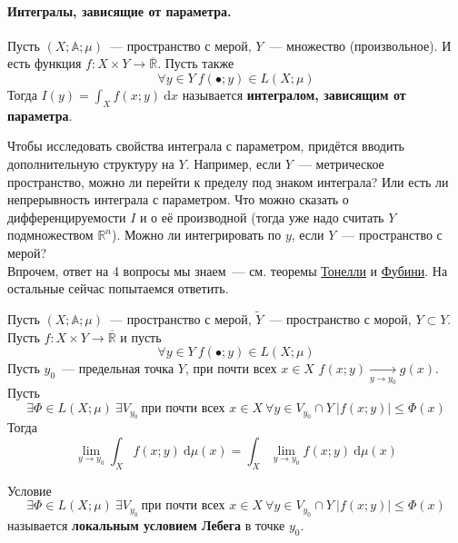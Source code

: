 \documentclass{article}
\begin{document}
    \paragraph{Интегралы, зависящие от параметра.}
    \begin{definition}
        Пусть $(X;\mathbb A;\mu)$~--- пространство с мерой, $Y$~--- множество (произвольное). И есть функция $f\colon X\times Y\to\overline{\mathbb R}$. Пусть также
        $$\forall y\in Y~f(\bullet;y)\in L(X;\mu)$$
        Тогда $I(y)=\int_Xf(x;y)~\mathrm dx$ называется \textbf{интегралом, зависящим от параметра}.
    \end{definition}
    \begin{remark}
        Чтобы исследовать свойства интеграла с параметром, придётся вводить дополнительную структуру на $Y$. Например, если $Y$~--- метрическое пространство, можно ли перейти к пределу под знаком интеграла? Или есть ли непрерывность интеграла с параметром. Что можно сказать о дифференцируемости $I$ и о её производной (тогда уже надо считать $Y$ подмножеством $\mathbb R^n$). Можно ли интегрировать по $y$, если $Y$~--- пространство с мерой?\\
        Впрочем, ответ на 4 вопросы мы знаем~--- см. теоремы \hyperref[Теорема Тонелли]{Тонелли} и \hyperref[Теорема Фубини]{Фубини}. На остальные сейчас попытаемся ответить.
    \end{remark}
    \begin{theorem}
        \label{Предельный переход по параметру под знаком интеграла}
        Пусть $(X;\mathbb A;\mu)$~--- пространство с мерой, $\tilde Y$~--- пространство с морой, $Y\subset Y$. Пусть $f\colon X\times Y\to\overline{\mathbb R}$ и пусть
        $$\forall y\in Y~f(\bullet;y)\in L(X;\mu)$$
        Пусть $y_0$~--- предельная точка $Y$, при почти всех $x\in X$ $f(x;y)\underset{y\to y_0}\rightarrow g(x)$.\\
        Пусть
        $$\exists\Phi\in L(X;\mu)~\exists V_{y_0}~\text{при почти всех }x\in X~\forall y\in V_{y_0}\cap Y~|f(x;y)|\leqslant\Phi(x)$$
        Тогда
        $$
        \lim\limits_{y\to y_0}\int_Xf(x;y)~\mathrm d\mu(x)=\int_X\lim\limits_{y\to y_0}f(x;y)~\mathrm d\mu(x)
        $$
    \end{theorem}
    \begin{definition}
        Условие
        $$\exists\Phi\in L(X;\mu)~\exists V_{y_0}~\text{при почти всех }x\in X~\forall y\in V_{y_0}\cap Y~|f(x;y)|\leqslant\Phi(x)$$
        называется \textbf{локальным условием Лебега} в точке $y_0$.
    \end{definition}
\end{document}
